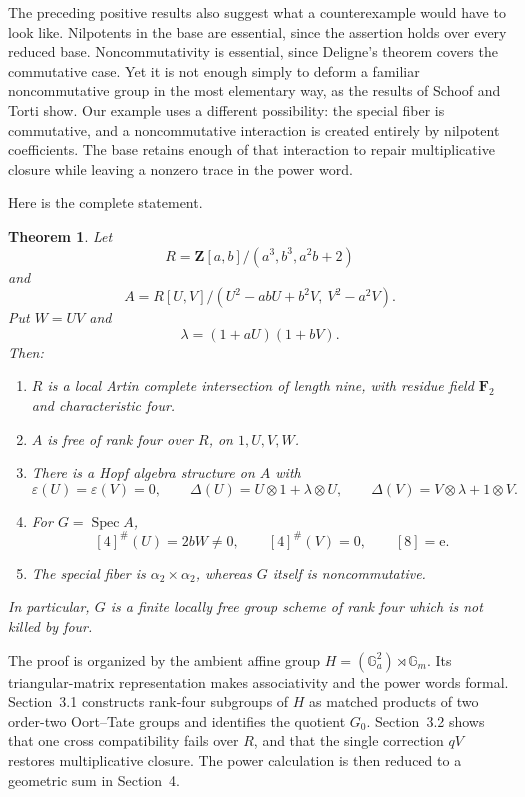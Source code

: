 \documentclass[11pt]{amsart}
\newtheorem{theorem}{Theorem}[section]
\theoremstyle{remark}
\newcommand{\Z}{\mathbf Z}
\newcommand{\F}{\mathbf F}
\newcommand{\Ga}{\mathbb G_a}
\newcommand{\Gm}{\mathbb G_m}
\newcommand{\Spec}{\operatorname{Spec}}
\newcommand{\eps}{\varepsilon}
\newcommand{\ot}{\otimes}
\newcommand{\unit}{\mathrm e}
\begin{document}
The preceding positive results also suggest what a counterexample would
have to look like.  Nilpotents in the base are essential, since the
assertion holds over every reduced base.  Noncommutativity is essential,
since Deligne's theorem covers the commutative case.  Yet it is not
enough simply to deform a familiar noncommutative group in the most
elementary way, as the results of Schoof and Torti show.  Our example
uses a different possibility: the special fiber is commutative, and a
noncommutative interaction is created entirely by nilpotent
coefficients.  The base retains enough of that interaction to repair
multiplicative closure while leaving a nonzero trace in the power word.

Here is the complete statement.

\begin{theorem}\label{thm:main}
Let
\begin{equation}\label{eq:R}
 R=\Z[a,b]/(a^3,b^3,a^2b+2)
\end{equation}
and
\begin{equation}\label{eq:A}
 A=R[U,V]/(U^2-abU+b^2V,\ V^2-a^2V).
\end{equation}
Put \(W=UV\) and
\begin{equation}\label{eq:lambda}
 \lambda=(1+aU)(1+bV).
\end{equation}
Then:
\begin{enumerate}
\item \(R\) is a local Artin complete intersection of length nine,
with residue field \(\F_2\) and characteristic four.
\item \(A\) is free of rank four over \(R\), on \(1,U,V,W\).
\item There is a Hopf algebra structure on \(A\) with
\[
 \eps(U)=\eps(V)=0,\qquad
 \Delta(U)=U\ot1+\lambda\ot U,\qquad
 \Delta(V)=V\ot\lambda+1\ot V.
\]
\item For \(G=\Spec A\),
\[
 [4]^\#(U)=2bW\ne0,\qquad
 [4]^\#(V)=0,\qquad
 [8]=\unit.
\]
\item The special fiber is \(\alpha_2\times\alpha_2\), whereas \(G\)
itself is noncommutative.
\end{enumerate}
In particular, \(G\) is a finite locally free group scheme of rank four
which is not killed by four.
\end{theorem}

The proof is organized by the ambient affine group
\(H=(\Ga^2)\rtimes\Gm\).  Its triangular-matrix representation
makes associativity and the power words formal.  Section~3.1 constructs
rank-four subgroups of \(H\) as matched products of two order-two
Oort--Tate groups and identifies the quotient \(G_0\).  Section~3.2
shows that one cross compatibility fails over \(R\), and that the
single correction \(qV\) restores multiplicative closure.  The power
calculation is then reduced to a geometric sum in Section~4.
\end{document}
